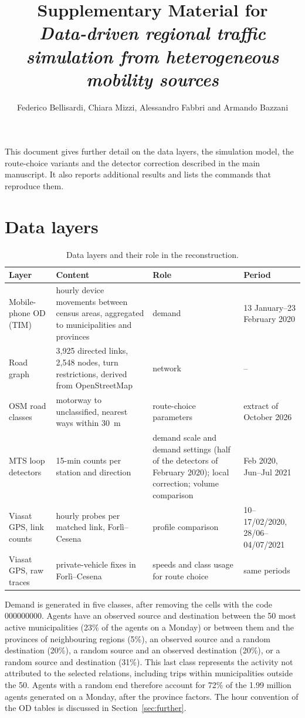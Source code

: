\documentclass[11pt,a4paper]{article}
\title{Supplementary Material for\\
\emph{Data-driven regional traffic simulation from heterogeneous mobility sources}}
\author{Federico Bellisardi, Chiara Mizzi, Alessandro Fabbri and Armando Bazzani}
\date{}
\begin{document}
\maketitle


\noindent This document gives further detail on the data layers, the simulation model, the route-choice variants and the detector correction described in the main manuscript. It also reports additional results and lists the commands that reproduce them.

\section{Data layers}
\label{sec:data-layers}

\begin{table}[htbp]\centering
\caption{Data layers and their role in the reconstruction.}
\label{tab:layers}
\begin{tabularx}{\textwidth}{@{}lXXl@{}}\toprule
Layer & Content & Role & Period \\\midrule
Mobile-phone OD (TIM) & hourly device movements between census areas, aggregated to municipalities and provinces & demand & 13 January--23 February 2020 \\
Road graph & 3,925 directed links, 2,548 nodes, turn restrictions, derived from OpenStreetMap & network & -- \\
OSM road classes & motorway to unclassified, nearest ways within 30~m & route-choice parameters & extract of October 2026 \\
MTS loop detectors & 15-min counts per station and direction & demand scale and demand settings (half of the detectors of February 2020); local correction; volume comparison & Feb 2020, Jun--Jul 2021 \\
Viasat GPS, link counts & hourly probes per matched link, Forl\`i--Cesena & profile comparison & 10--17/02/2020, 28/06--04/07/2021 \\
Viasat GPS, raw traces & private-vehicle fixes in Forl\`i--Cesena & speeds and class usage for route choice & same periods \\
\bottomrule\end{tabularx}
\end{table}

Demand is generated in five classes, after removing the cells with the code 000000000. Agents have an observed source and destination between the 50 most active municipalities (23\% of the agents on a Monday) or between them and the provinces of neighbouring regions (5\%), an observed source and a random destination (20\%), a random source and an observed destination (20\%), or a random source and destination (31\%). This last class represents the activity not attributed to the selected relations, including trips within municipalities outside the 50. Agents with a random end therefore account for 72\% of the 1.99 million agents generated on a Monday, after the province factors. The hour convention of the OD tables is discussed in Section~\ref{sec:further}.
\end{document}
